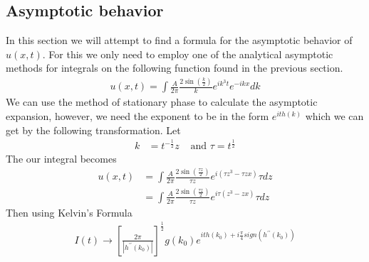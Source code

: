 \documentclass{article}
\begin{document}
\subsection{Asymptotic behavior}
In this section we will attempt to find a formula for the asymptotic behavior of $u(x,t)$. For this we only need to employ one of the analytical asymptotic methods for integrals on the following function found in the previous section. 
\begin{align*}
u(x,t) =  \int \frac{A}{2\pi}\frac{2\sin(\frac{k}{2})}{k} e^{ik^3t}e^{-ikx}dk
\end{align*}
We can use the method of stationary phase to calculate the asymptotic expansion, however, we need the exponent to be in the form $e^{ith(k)}$ which we can get by the following transformation. Let
\begin{align*}
k &= t^{-\frac{1}{2}}z &\text{ and } \tau=t^{\frac{1}{2}}
\end{align*}
The our integral becomes 
\begin{align*}
u(x,t) &= \int \frac{A}{2\pi} \frac{2\sin(\frac{\tau z}{2})}{\tau z} e^{i(\tau z^3 - \tau z x)} \tau dz \\
&= \int \frac{A}{2\pi} \frac{2\sin(\frac{\tau z}{2})}{\tau z} e^{i\tau(z^3 - z x)} \tau dz
\end{align*}
Then using Kelvin's Formula 
\begin{align*}
I(t) \rightarrow \left[\frac{2\pi}{|h^{\prime\prime}(k_0)|}\right]^{\frac{1}{2}} g(k_0)e^{ith(k_0) + i \frac{\pi}{4}sign(h^{\prime\prime}(k_0))}
\end{align*}
\end{document}
